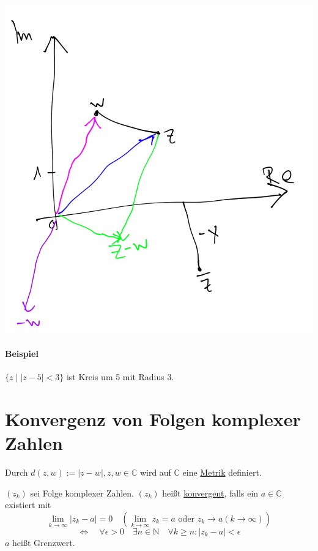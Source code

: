 \documentclass[a4paper,11pt,notitlepage]{report}
\theoremstyle{definition}
\newcommand{\N}{{\ensuremath{\mathbb{N}}}}
\newcommand{\C}{{\ensuremath{\mathbb{C}}}}
\newenvironment{definition}[1]{
	\begin{definitions}
	\marginnote{\emph{#1}}
}{\end{definitions}}
\begin{document}
\begin{center}
\includegraphics[scale=0.2]{images/16_04_12_02.jpg}
\end{center}

\paragraph{Beispiel}
$\{z \mid |z-5| < 3\}$ ist Kreis um 5 mit Radius 3.

\section{Konvergenz von Folgen komplexer Zahlen}

Durch $d(z,w):= |z-w|, z,w \in \C$ wird auf $\C$ eine \underline{Metrik} definiert.

\begin{definition}{}
$(z_k)$ sei Folge komplexer Zahlen.\newline
$(z_k)$ heißt \underline{konvergent}, falls ein $a \in \C$ existiert mit
$$\lim_{k\to\infty}|z_k-a|=0 \quad \left(\lim_{k\to\infty}z_k=a \text{ oder } z_k\to a (k\to\infty)\right)$$
$$\Leftrightarrow\quad\forall \epsilon>0 \quad\exists n\in\N \quad\forall k\geq n:|z_k-a|<\epsilon$$
$a$ heißt Grenzwert.
\end{definition}
\end{document}
